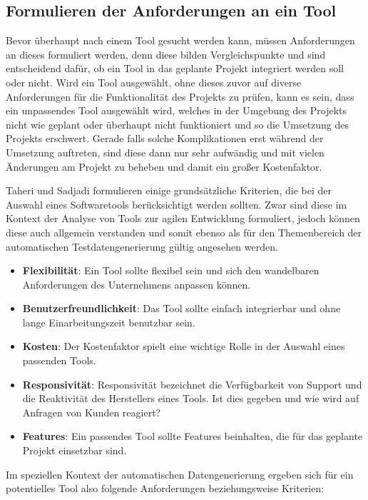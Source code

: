 \subsection{Formulieren der Anforderungen an ein Tool}\label{toolanalyseanforderungen}
Bevor überhaupt nach einem Tool gesucht werden kann, müssen Anforderungen an dieses formuliert werden, denn diese bilden Vergleichspunkte und sind entscheidend dafür, ob ein Tool in das geplante Projekt integriert werden soll oder nicht. Wird ein Tool ausgewählt, ohne dieses zuvor auf diverse Anforderungen für die Funktionalität des Projekts zu prüfen, kann es sein, dass ein unpassendes Tool ausgewählt wird, welches in der Umgebung des Projekts nicht wie geplant oder überhaupt nicht funktioniert und so die Umsetzung des Projekts erschwert. \cite[S. 249]{fewster:1999} Gerade falls solche Komplikationen erst während der Umsetzung auftreten, sind diese dann nur sehr aufwändig und mit vielen Änderungen am Projekt zu beheben und damit ein großer Kostenfaktor.

Taheri und Sadjadi \cite{taheri:2015} formulieren einige grundsätzliche Kriterien, die bei der Auswahl eines Softwaretools berücksichtigt werden sollten. Zwar sind diese im Kontext der Analyse von Tools zur agilen Entwicklung formuliert, jedoch können diese auch allgemein verstanden und somit ebenso als für den Themenbereich der automatischen Testdatengenerierung gültig angesehen werden.

\begin{itemize}
    \item \textbf{Flexibilität}: Ein Tool sollte flexibel sein und sich den wandelbaren Anforderungen des Unternehmens anpassen können.
    \item \textbf{Benutzerfreundlichkeit}: Das Tool sollte einfach integrierbar und ohne lange Einarbeitungszeit benutzbar sein.
    \item \textbf{Kosten}: Der Kostenfaktor spielt eine wichtige Rolle in der Auswahl eines passenden Tools.
    \item \textbf{Responsivität}: Responsivität bezeichnet die Verfügbarkeit von Support und die Reaktivität des Herstellers eines Tools. Ist dies gegeben und wie wird auf Anfragen von Kunden reagiert?
    \item \textbf{Features}: Ein passendes Tool sollte Features beinhalten, die für das geplante Projekt einsetzbar sind. \cite{taheri:2015}
\end{itemize}

Im speziellen Kontext der automatischen Datengenerierung ergeben sich für ein potentielles Tool also folgende Anforderungen beziehungsweise Kriterien:

